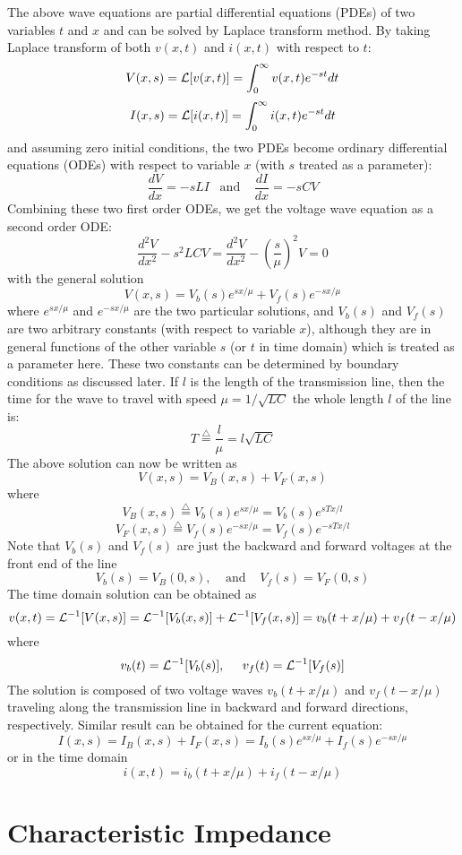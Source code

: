 The above wave equations are partial differential equations (PDEs) of two 
variables $t$ and $x$ and can be solved by Laplace transform method. By
taking Laplace transform of both $v(x,t)$ and $i(x,t)$ with respect to $t$:
\[ 	V(x,s)={\cal L}[v(x,t)]=\int_0^\infty v(x,t)e^{-st}dt	\]
\[ 	I(x,s)={\cal L}[i(x,t)]=\int_0^\infty i(x,t)e^{-st}dt	\]
and assuming zero initial conditions, the two PDEs become ordinary 
differential equations (ODEs) with respect to variable $x$ (with $s$ treated
as a parameter):
\[	\frac{dV}{dx}=-sLI\;\;\;\mbox{and}\;\;\;\;\frac{dI}{dx}=-sCV	\]
Combining these two first order ODEs, we get the voltage wave equation as
a second order ODE:
\[	\frac{d^2 V}{d x^2}-s^2LCV
	=\frac{d^2 V}{d x^2}-(\frac{s}{\mu})^2V=0	\]
with the general solution
\[	V(x,s)=V_b(s)e^{sx/\mu}+V_f(s)e^{-sx/\mu}	\]
where $e^{sx/\mu}$ and $e^{-sx/\mu}$ are the two particular solutions, and 
$V_b(s)$ and $V_f(s)$ are two arbitrary constants (with respect to variable 
$x$), although they are in general functions of the other variable $s$ (or
$t$ in time domain) which is treated as a parameter here. These two constants
can be determined by boundary conditions as discussed later. If $l$ is the 
length of the transmission line, then the time for the wave to travel with 
speed $\mu=1/\sqrt{LC}$ the whole length $l$ of the line is:
\[	T\stackrel{\triangle}{=}\frac{l}{\mu} = l\sqrt{LC} \]
The above solution can now be written as
\[	V(x,s)=V_B(x,s)+V_F(x,s)	\]
where
\[	V_B(x,s)\stackrel{\triangle}{=}V_b(s)e^{ sx/\mu}=V_b(s)e^{ sTx/l} \]
\[	V_F(x,s)\stackrel{\triangle}{=}V_f(s)e^{-sx/\mu}=V_f(s)e^{-sTx/l} \]
Note that $V_b(s)$ and $V_f(s)$ are just the backward and forward voltages
at the front end of the line
\[	V_b(s)=V_B(0,s),\;\;\;\;\mbox{and}\;\;\;\;V_f(s)=V_F(0,s)	\]
The time domain solution can be obtained as
\[
v(x,t)={\cal L}^{-1}[V(x,s)]={\cal L}^{-1}[V_b(x,s)]+{\cal L}^{-1}[V_f(x,s)]
=v_b(t+x/\mu)+v_f(t-x/\mu)	
\]
where
\[ v_b(t)={\cal L}^{-1}[V_b(s)],\;\;\;\;\;v_f(t)={\cal L}^{-1}[V_f(s)] \]
The solution is composed of two voltage waves $v_b(t+x/\mu)$ and $v_f(t-x/\mu)$
traveling along the transmission line in backward and forward directions, 
respectively. Similar result can be obtained for the current equation:
\[	I(x,s)=I_B(x,s)+I_F(x,s)=I_b(s)e^{sx/\mu}+I_f(s)e^{-sx/\mu} \]
or in the time domain
\[	i(x,t)=i_b(t+x/\mu)+i_f(t-x/\mu)	\]

\newpage
\section*{Characteristic Impedance}

